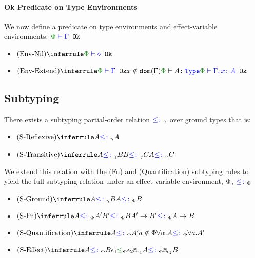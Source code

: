 \documentclass{report}
\begin{document}
\paragraph{Ok Predicate on Type Environments}
We now define a predicate on type environments and effect-variable environments: $\oke{\P}{\G}$

\begin{itemize}
    \item $\ntreerulez{\envnil}{\oke{\P}{\nil}}$
    \item $\ntreeruleIII{\envextend}{\oke{\P}{\G}}{ x\notin\dom{\G}}{ \wellformedt{\P}{A}}{\oke{\P}{\gax}}$
\end{itemize}



\subsection{Subtyping}
    There exists a subtyping partial-order relation $\subtype_{\ground}$ over ground types that is:
    \begin{itemize}
        \item $\ntreerulez{\sreflexive}{A \subtype_{\ground} A}$
        \item $\ntreeruleII{\stransitive}{A \subtype_{\ground} B }{ B \subtype_{\ground} C}{A \subtype_{\ground} C}$
    \end{itemize}

    We extend this relation with the (Fn) and (Quantification) subtyping rules to yield the full subtyping relation under an effect-variable environment, $\P$, $\subtypep$

    \begin{itemize}
        \item $\ntreeruleI{\sground}{A \subtype_{\ground} B}{A \subtypep B}$
        \item $\ntreeruleII{\sfun}{A \subtypep A' }{ B' \subtypep B }{\fntype{A'}{B'} \subtypep \ab}$
        \item $\ntreeruleII{\squant}{A\subtypep A'}{a\notin\P}{\all{\a}{A}\subtypep\all{a}{A'}}$
        \item $\ntreeruleII{\seffect}{A\subtypep B}{ \e_1\subeffectp\e_2}{\M{\e_1}{A}\subtypep\M{\e_2}{B}}$
    \end{itemize}
\end{document}
